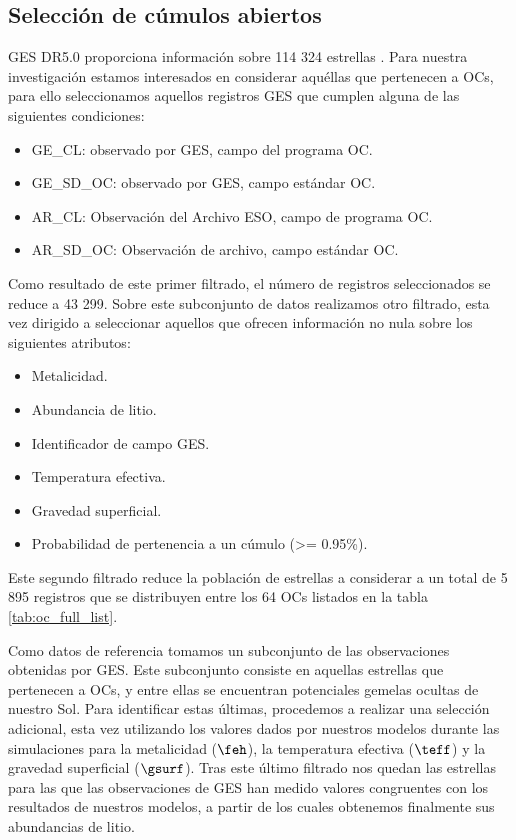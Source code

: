 \subsection{Selección de cúmulos abiertos}
GES DR5.0 proporciona información sobre 114 324 estrellas \citep[véase][para más detalles]{Gilmore2022}. Para nuestra investigación estamos interesados en considerar aquéllas que pertenecen a OCs, para ello seleccionamos aquellos registros GES que cumplen alguna de las siguientes condiciones:

\begin{itemize}
	\item GE\_CL: observado por GES, campo del programa OC.
	\item GE\_SD\_OC: observado por GES, campo estándar OC.
	\item AR\_CL: Observación del Archivo ESO, campo de programa OC.
	\item AR\_SD\_OC: Observación de archivo, campo estándar OC.
\end{itemize}
	
Como resultado de este primer filtrado, el número de registros seleccionados se reduce a 43 299. Sobre este subconjunto de datos realizamos otro filtrado, esta vez dirigido a seleccionar aquellos que ofrecen información no nula sobre los siguientes atributos:

\begin{itemize}
	\item Metalicidad.
	\item Abundancia de litio.
	\item Identificador de campo GES.
	\item Temperatura efectiva.
	\item Gravedad superficial.
	\item Probabilidad de pertenencia a un cúmulo (>= 0.95\%).
\end{itemize}

Este segundo filtrado reduce la población de estrellas a considerar a un total de 5 895 registros que se distribuyen entre los 64 OCs listados en la tabla \ref{tab:oc_full_list}.\par

Como datos de referencia tomamos un subconjunto de las observaciones obtenidas por GES. Este subconjunto consiste en aquellas estrellas que pertenecen a OCs, y entre ellas se encuentran potenciales gemelas ocultas de nuestro Sol. Para identificar estas últimas, procedemos a realizar una selección adicional, esta vez utilizando los valores dados por nuestros modelos durante las simulaciones para la metalicidad ($\feh$), la temperatura efectiva ($\teff$) y la gravedad superficial ($\gsurf$). Tras este último filtrado nos quedan las estrellas para las que las observaciones de GES han medido valores congruentes con los resultados de nuestros modelos, a partir de los cuales obtenemos finalmente sus abundancias de litio.\par

